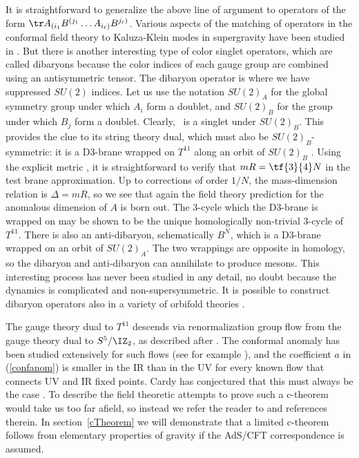 It is straightforward to generalize the above line of argument to operators
of the form $\tr A_{(i_1} B^{(j_1} \ldots A_{i_\ell)} B^{j_\ell)}$.
Various aspects of the matching of operators in the conformal field theory
to Kaluza-Klein modes in supergravity have been studied in
\cite{Klebanov:1998hh,Gubser:1999vd,Jatkar:1999zk}.  But there is another
interesting type of color singlet operators, which are called dibaryons
because the color indices of each gauge group are combined using an
antisymmetric tensor. The dibaryon operator is
 where we have suppressed $SU(2)$ indices.  Let us use the notation
$SU(2)_A$ for the global symmetry
group under which $A_i$ form a doublet, and $SU(2)_B$ for
the group under which $B_j$ form a doublet.  Clearly, \Dibaryon\ is a
singlet under $SU(2)_B$.  This provides the clue to its string theory dual,
which must also be $SU(2)_B$-symmetric: it is a D3-brane wrapped on
$T^{11}$ along an orbit of $SU(2)_B$ \cite{Gubser:1998fp}.  Using the explicit
metric \TMet, it is straightforward to verify that $mR = \tf{3}{4} N$ in
the test brane approximation.  Up to corrections of order $1/N$, the
mass-dimension relation is $\Delta = mR$, so we see that again the 
field theory
prediction for the anomalous dimension of $A$ is born out. The 3-cycle
which the D3-brane is wrapped on may be shown to be the unique
homologically non-trivial 3-cycle of $T^{11}$. There is also
an anti-dibaryon, schematically $B^N$, which is a D3-brane wrapped on an
orbit of $SU(2)_A$.  The two wrappings are opposite in homology, so the
dibaryon and anti-dibaryon can annihilate to produce mesons.  This
interesting process has never been studied in any detail, no doubt because
the dynamics is complicated and non-supersymmetric.  It is possible to
construct dibaryon operators also in a variety of orbifold theories
\cite{Gubser:1998fp,Gukov:1998kn}.

The gauge theory dual to $T^{11}$ descends via renormalization group flow
from the gauge theory dual to $S^5/\IZ_2$, as described after \DefPot.
The conformal anomaly has been studied extensively for such flows (see for
example \cite{Anselmi:1997am}), and the coefficient $a$ in (\ref{confanom}) is
smaller in the IR than in the UV for every known flow that connects UV 
and IR
fixed points.  
        Cardy has conjectured that this must always be the case
        \cite{Cardy:1988cw}.  To describe the field theoretic attempts
        to prove such a c-theorem would take us too far afield, so
        instead we refer the reader to \cite{Forte:1998dx}
        and references therein.
        In section~\ref{cTheorem} we will demonstrate that a limited c-theorem
        follows from elementary properties of gravity if the AdS/CFT
        correspondence is assumed.

